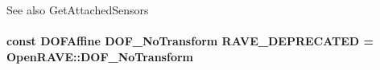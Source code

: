 \label{classOpenRAVE_1_1RobotBase_aac98310b73ec888db282a3ca58db245a}
\begin{DoxySeeAlso}{See also}
GetAttachedSensors 
\end{DoxySeeAlso}
\hypertarget{classOpenRAVE_1_1RobotBase_ad7131b2e388f7f953e9cc14f7336c8e2}{
\paragraph[{RAVE\_\-DEPRECATED}]{\setlength{\rightskip}{0pt plus 5cm}const {\bf DOFAffine} DOF\_\-NoTransform {\bf RAVE\_\-DEPRECATED} = OpenRAVE::DOF\_\-NoTransform}\hfill}
\label{classOpenRAVE_1_1RobotBase_ad7131b2e388f7f953e9cc14f7336c8e2}
